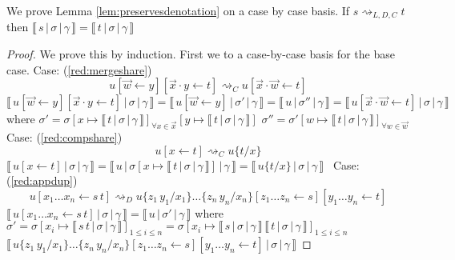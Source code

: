 \documentclass[a4paper,UKenglish,cleveref, autoref]{lipics-v2019}
\newcommand{\app}[2]{#1 \, #2}
\newcommand{\share}[3]{#1 [#2 \leftarrow #3]}
\newcommand{\sub}[3]{#1 \{ #2 / #3 \}}
\newcommand{\readbackwmap}[3]{\llbracket \, #1 \, \vert \, #2 \, \vert \, #3  \, \rrbracket }
\begin{document}
\noindent We prove Lemma \ref{lem:preservesdenotation} on a case by case basis. If $s \rightsquigarrow_{L, D, C} t$ then $\readbackwmap{s}{\sigma}{\gamma} = \readbackwmap{t}{\sigma}{\gamma}$

\begin{proof}
We prove this by induction. First we to a case-by-case basis for the base case.
\newline
\newline
Case: (\ref{red:mergeshare})
$$\share{\share{u}{\vec{w}}{y}}{\vec{x} \cdot y}{t} \rightsquigarrow_{C} \share{u}{\vec{x} \cdot \vec{w}}{t} $$
$\readbackwmap{\share{\share{u}{\vec{w}}{y}}{\vec{x} \cdot y}{t}}{\sigma}{\gamma} = \readbackwmap{\share{u}{\vec{w}}{y}}{\sigma'}{\gamma} = \readbackwmap{u}{\sigma''}{\gamma} = \readbackwmap{\share{u}{\vec{x} \cdot \vec{w}}{t}}{\sigma}{\gamma}$
\newline
where
\newline
$\sigma' = \sigma [x \mapsto \readbackwmap{t}{\sigma}{\gamma}]_{\forall x \in \vec{x}} [y \mapsto \readbackwmap{t}{\sigma}{\gamma}]$
\newline
$\sigma'' = \sigma' [w \mapsto \readbackwmap{t}{\sigma}{\gamma}]_{\forall w \in \vec{w}}$
\newline
\newline
\newline
Case: (\ref{red:compshare})
$$\share{u}{x}{t} \rightsquigarrow_{C} \sub{u}{t}{x}$$
$\readbackwmap{\share{u}{x}{t}}{\sigma}{\gamma} = \readbackwmap{u}{\sigma[x \mapsto \readbackwmap{t}{\sigma}{\gamma}]}{\gamma} = \readbackwmap{\sub{u}{t}{x}}{\sigma}{\gamma} $\
\newline
\newline
Case: (\ref{red:appdup})
$$\share{u}{x_{1} \dots x_{n}}{\app{s}{t}} \rightsquigarrow_{D} \share{\share{\sub{\sub{u}{\app{z_{1}}{y_{1}}}{x_{1}}\dots}{\app{z_{n}}{y_{n}}}{x_{n}}}{z_{1} \dots z_{n}}{s}}{y_{1} \dots y_{n}}{t}$$
$\readbackwmap{\share{u}{x_{1} \dots x_{n}}{\app{s}{t}}}{\sigma}{\gamma} = \readbackwmap{u}{\sigma'}{\gamma}$
\newline
where
\newline
$\sigma' = \sigma [ x_{i} \mapsto \readbackwmap{\app{s}{t}}{\sigma}{\gamma}]_{1 \leq i \leq n} = \sigma [x_{i} \mapsto \app{\readbackwmap{s}{\sigma}{\gamma}}{\readbackwmap{t}{\sigma}{\gamma}}]_{1 \leq i \leq n}$
\newline
\newline
$\readbackwmap{ \share{\share{\sub{\sub{u}{\app{z_{1}}{y_{1}}}{x_{1}}\dots}{\app{z_{n}}{y_{n}}}{x_{n}}}{z_{1} \dots z_{n}}{s}}{y_{1} \dots y_{n}}{t}}{\sigma}{\gamma}$

\end{proof}
\end{document}
